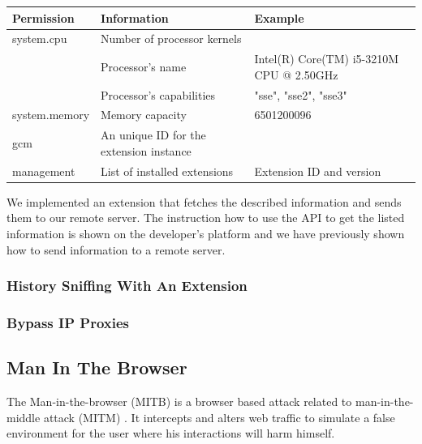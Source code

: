 \documentclass[article,colorback,accentcolor=tud9c,type=bsc]{tudthesis}
\let\stdsubsection\subsection
\let\stdsubsubsection\subsubsection
\renewcommand\subsection{\newpage\stdsubsection}
\renewcommand\subsubsection{\newpage\stdsubsubsection}
\begin{document}
	\begin{tabular}{l|l|l}
		\textbf{Permission} & \textbf{Information} & \textbf{Example} \\ \hline
		system.cpu & Number of processor kernels & \\
		& Processor's name & Intel(R) Core(TM) i5-3210M CPU @ 2.50GHz \\
		& Processor's capabilities & "sse", "sse2", "sse3"  \\ 
		system.memory & Memory capacity & 6501200096 \\
		gcm & An unique ID for the extension instance & \\
		management & List of installed extensions & Extension ID and version \\
	\end{tabular} 
	
	We implemented an extension that fetches the described information and sends them to our remote server. The instruction how to use the API to get the listed information is shown on the developer's platform and we have previously shown how to send information to a remote server. \\
	
	
\subsubsection{History Sniffing With An Extension}
	
	
\subsubsection{Bypass IP Proxies}
	
	
\subsection{Man In The Browser}

	The Man-in-the-browser (MITB) is a browser based attack related to man-in-the-middle attack (MITM) \cite{Curran:2012:MBA:2433195.2433198}. It intercepts and alters web traffic to simulate a false environment for the user where his interactions will harm himself. \\
	
\end{document}
